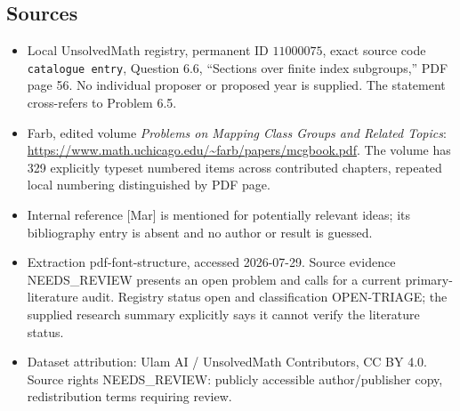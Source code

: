 \documentclass[11pt]{article}
\begin{document}
\subsection{Sources}
\begin{itemize}
\item Local UnsolvedMath registry, permanent ID \(11000075\), exact source code \texttt{catalogue entry}, Question 6.6, ``Sections over finite index subgroups,'' PDF page 56. No individual proposer or proposed year is supplied. The statement cross-refers to Problem 6.5.
\item Farb, edited volume \emph{Problems on Mapping Class Groups and Related Topics}: \url{https://www.math.uchicago.edu/~farb/papers/mcgbook.pdf}. The volume has 329 explicitly typeset numbered items across contributed chapters, repeated local numbering distinguished by PDF page.
\item Internal reference [Mar] is mentioned for potentially relevant ideas; its bibliography entry is absent and no author or result is guessed.
\item Extraction pdf-font-structure, accessed 2026-07-29. Source evidence NEEDS\_REVIEW presents an open problem and calls for a current primary-literature audit. Registry status open and classification OPEN-TRIAGE; the supplied research summary explicitly says it cannot verify the literature status.
\item Dataset attribution: Ulam AI / UnsolvedMath Contributors, CC BY 4.0. Source rights NEEDS\_REVIEW: publicly accessible author/publisher copy, redistribution terms requiring review.
\end{itemize}
\end{document}
